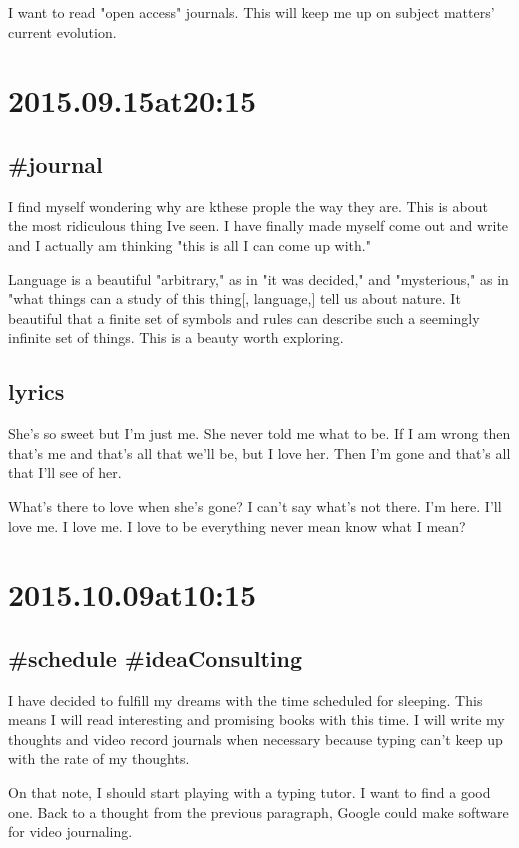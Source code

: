 \begin{enumerate}
I want to read "open access" journals. This will keep me up on subject matters' current evolution.

\section*{2015.09.15at20:15}
\subsection*{\#journal}
I find myself wondering why are kthese prople the way they are. This is about the most ridiculous thing Ive seen. I have finally made myself come out and write and I actually am thinking "this is all I can come up with."

Language is a beautiful "arbitrary," as in "it was decided," and "mysterious," as in "what things can a study of this thing[, language,] tell us about nature. It beautiful that a finite set of symbols and rules can describe such a seemingly infinite set of things. This is a beauty worth exploring.

\subsection*{lyrics}
She's so sweet but I'm just me.
She never told me what to be.
If I am wrong then that's me and that's all that we'll be, but I love her.
Then I'm gone and that's all that I'll see of her.

What's there to love when she's gone?
I can't say what's not there.
I'm here.
I'll love me.
I love me.
I love to be
everything
never mean
know what I mean?

\section*{2015.10.09at10:15}
\subsection*{ \#schedule \#ideaConsulting }
I have decided to fulfill my dreams with the time scheduled for sleeping. This means I will read interesting and promising books with this time. I will write my thoughts and video record journals when necessary because typing can't keep up with the rate of my thoughts.

On that note, I should start playing with a typing tutor. I want to find a good one. Back to a thought from the previous paragraph, Google could make software for video journaling.


\end{enumerate}
